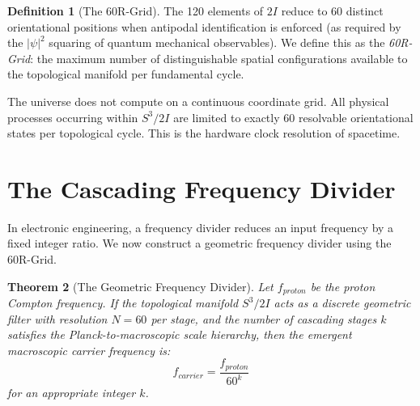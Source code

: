 \documentclass[12pt, a4paper]{article}
\theoremstyle{plain}
\newtheorem{theorem}{Theorem}[section]
\theoremstyle{definition}
\newtheorem{definition}[theorem]{Definition}
\begin{document}
\begin{definition}[The 60R-Grid]
The 120 elements of $2I$ reduce to 60 distinct orientational positions when antipodal identification is enforced (as required by the $|\psi|^2$ squaring of quantum mechanical observables). We define this as the \emph{60R-Grid}: the maximum number of distinguishable spatial configurations available to the topological manifold per fundamental cycle.
\end{definition}

\begin{axiom}
The universe does not compute on a continuous coordinate grid. All physical processes occurring within $S^3/2I$ are limited to exactly 60 resolvable orientational states per topological cycle. This is the hardware clock resolution of spacetime.
\end{axiom}

\section{The Cascading Frequency Divider}\label{sec:divider}

In electronic engineering, a frequency divider reduces an input frequency by a fixed integer ratio. We now construct a geometric frequency divider using the 60R-Grid.

\begin{theorem}[The Geometric Frequency Divider]\label{thm:divider}
Let $f_{proton}$ be the proton Compton frequency. If the topological manifold $S^3/2I$ acts as a discrete geometric filter with resolution $N = 60$ per stage, and the number of cascading stages $k$ satisfies the Planck-to-macroscopic scale hierarchy, then the emergent macroscopic carrier frequency is:
\begin{equation}\label{eq:divider}
    f_{carrier} = \frac{f_{proton}}{60^k}
\end{equation}
for an appropriate integer $k$.
\end{theorem}
\end{document}
